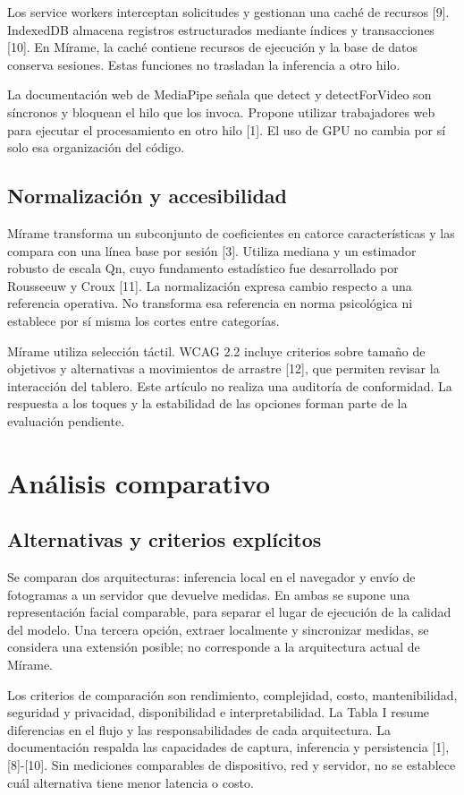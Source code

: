 \documentclass[conference,letterpaper]{IEEEtran}
\begin{document}
Los service workers interceptan solicitudes y gestionan una caché de recursos [9]. IndexedDB almacena registros estructurados mediante índices y transacciones [10]. En Mírame, la caché contiene recursos de ejecución y la base de datos conserva sesiones. Estas funciones no trasladan la inferencia a otro hilo.

La documentación web de MediaPipe señala que detect y detectForVideo son síncronos y bloquean el hilo que los invoca. Propone utilizar trabajadores web para ejecutar el procesamiento en otro hilo [1]. El uso de GPU no cambia por sí solo esa organización del código.


\subsection{Normalización y accesibilidad}
Mírame transforma un subconjunto de coeficientes en catorce características y las compara con una línea base por sesión [3]. Utiliza mediana y un estimador robusto de escala Qn, cuyo fundamento estadístico fue desarrollado por Rousseeuw y Croux [11]. La normalización expresa cambio respecto a una referencia operativa. No transforma esa referencia en norma psicológica ni establece por sí misma los cortes entre categorías.

Mírame utiliza selección táctil. WCAG 2.2 incluye criterios sobre tamaño de objetivos y alternativas a movimientos de arrastre [12], que permiten revisar la interacción del tablero. Este artículo no realiza una auditoría de conformidad. La respuesta a los toques y la estabilidad de las opciones forman parte de la evaluación pendiente.


\section{Análisis comparativo}

\subsection{Alternativas y criterios explícitos}
Se comparan dos arquitecturas: inferencia local en el navegador y envío de fotogramas a un servidor que devuelve medidas. En ambas se supone una representación facial comparable, para separar el lugar de ejecución de la calidad del modelo. Una tercera opción, extraer localmente y sincronizar medidas, se considera una extensión posible; no corresponde a la arquitectura actual de Mírame.

Los criterios de comparación son rendimiento, complejidad, costo, mantenibilidad, seguridad y privacidad, disponibilidad e interpretabilidad. La Tabla I resume diferencias en el flujo y las responsabilidades de cada arquitectura. La documentación respalda las capacidades de captura, inferencia y persistencia [1], [8]-[10]. Sin mediciones comparables de dispositivo, red y servidor, no se establece cuál alternativa tiene menor latencia o costo.
\end{document}
